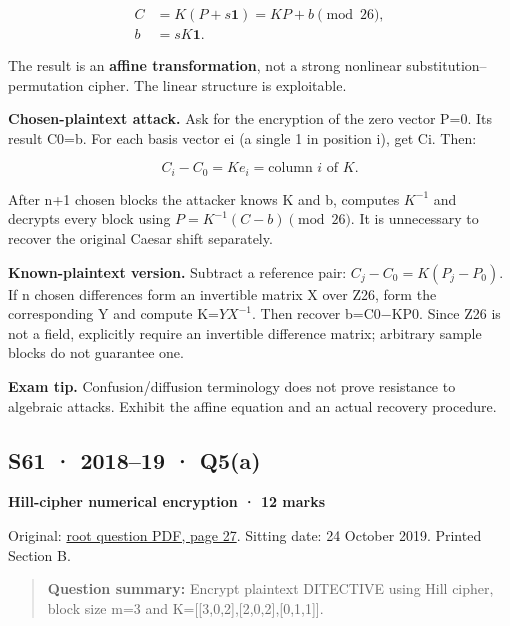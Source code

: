 \documentclass[11pt,a4paper]{article}
\begin{document}
\[
\begin{aligned}C&=K(P+s\mathbf1)=KP+b\pmod{26},\\b&=sK\mathbf1.\end{aligned}
\]

The result is an \textbf{affine transformation},\allowbreak{} not a strong nonlinear substitution–permutation cipher. The linear structure is exploitable.


\textbf{Chosen-plaintext attack.} Ask for the encryption of the zero vector P=\allowbreak{}0. Its result C0=\allowbreak{}b. For each basis vector ei (a single 1 in position i),\allowbreak{} get Ci. Then:



\[
C_i-C_0=Ke_i=\text{column }i\text{ of }K.
\]

After n+1 chosen blocks the attacker knows K and b,\allowbreak{} computes \(K^{-1}\) and decrypts every block using \(P=K^{-1}(C-b)\pmod{26}\). It is unnecessary to recover the original Caesar shift separately.


\textbf{Known-plaintext version.} Subtract a reference pair: \(C_j-C_0=K(P_j-P_0)\). If n chosen differences form an invertible matrix X over Z26,\allowbreak{} form the corresponding Y and compute K=\allowbreak{}\(YX^{-1}\). Then recover b=\allowbreak{}C0−KP0. Since Z26 is not a field,\allowbreak{} explicitly require an invertible difference matrix; arbitrary sample blocks do not guarantee one.



{\color{ForestGreen}\textbf{Exam tip.} Confusion/\allowbreak{}diffusion terminology does not prove resistance to algebraic attacks. Exhibit the affine equation and an actual recovery procedure.}




\clearpage
\subsection{S61 · 2018–19 · Q5(a)}\label{s61}

\textbf{Hill-cipher numerical encryption · 12 marks}


Original: \href{../../CSE405-Security_Merged.pdf\#page=27}{root question PDF,\allowbreak{} page 27}. Sitting date: 24 October 2019. Printed Section B.



\begin{quote}\small

\textbf{Question summary:} Encrypt plaintext DITECTIVE using Hill cipher,\allowbreak{} block size m=\allowbreak{}3 and K=\allowbreak{}[[3,\allowbreak{}0,\allowbreak{}2],\allowbreak{}[2,\allowbreak{}0,\allowbreak{}2],\allowbreak{}[0,\allowbreak{}1,\allowbreak{}1]].



\end{quote}
\end{document}
